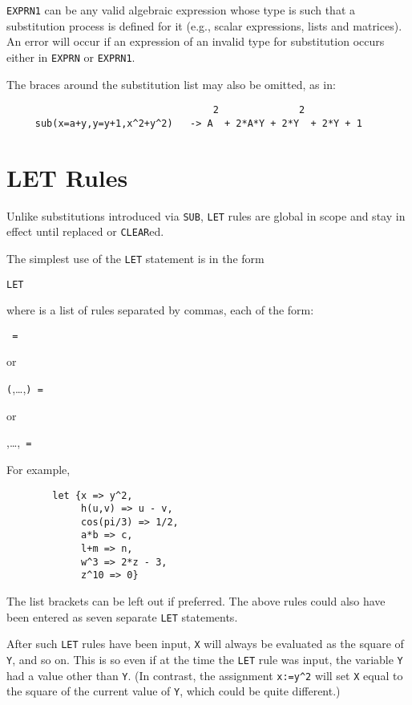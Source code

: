 \texttt{EXPRN1} can be any valid algebraic expression whose type is such that
a substitution process is defined for it (e.g., scalar expressions, lists
and matrices).  An error will occur if an expression of an invalid type
for substitution occurs either in \texttt{EXPRN} or \texttt{EXPRN1}.

The braces around the substitution list may also be omitted, as in:
\begin{verbatim}
                                    2              2
     sub(x=a+y,y=y+1,x^2+y^2)   -> A  + 2*A*Y + 2*Y  + 2*Y + 1
\end{verbatim}

\section{LET Rules}
\hypertarget{command:LET}{}
\hypertarget{reserved:impliesop}{}
Unlike substitutions introduced via \texttt{SUB}, \texttt{LET}
rules are global in scope and stay in effect until replaced or \texttt{CLEAR}ed.

The simplest use of the \texttt{LET} statement is in the form
\begin{syntax}
        \texttt{LET }
\end{syntax}
where  is a list of rules separated by commas, each
of the form:
\begin{syntax}
        \texttt{ = } 
\end{syntax}
or
\begin{syntax}
   \texttt{(},\dots,\texttt{) = }
\end{syntax}
or
\begin{syntax}
    ,\dots,\texttt{ = }
\end{syntax}
For example,
\begin{verbatim}
        let {x => y^2,
             h(u,v) => u - v,
             cos(pi/3) => 1/2,
             a*b => c,
             l+m => n,
             w^3 => 2*z - 3,
             z^10 => 0}
\end{verbatim}
The list brackets can be left out if preferred.  The above rules could
also have been entered as seven separate \texttt{LET} statements.

After such \texttt{LET} rules have been input, \texttt{X} will always be
evaluated as the square of \texttt{Y}, and so on.  This is so even if at the
time the \texttt{LET} rule was input, the variable \texttt{Y} had a value other
than \texttt{Y}. (In contrast, the assignment \texttt{x:=y\textasciicircum2} 
will set \texttt{X}
equal to the square of the current value of \texttt{Y}, which could be quite
different.)

